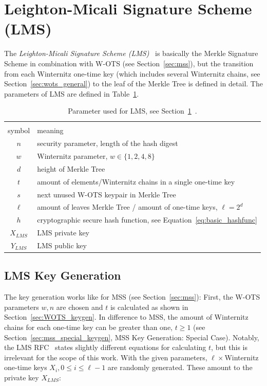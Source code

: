 \section{Leighton-Micali Signature Scheme (LMS)}
\label{sec:lms}
The \textit{Leighton-Micali Signature Scheme (LMS)}~\cite{LMS_RFC8554} is basically the Merkle Signature Scheme in combination with W-OTS (see Section~\ref{sec:mss}), but the transition from each Winternitz one-time key (which includes several Winternitz chains, see Section~\ref{sec:wots_general}) to the leaf of the Merkle Tree is defined in detail. 
The parameters of LMS are defined in Table~\ref{table:lms_param}.

\begin{table}
\centering
\begin{tabular}{c l} 
 \hline\noalign{\smallskip}
 \multicolumn{2}{c}{\textbf{LMS Parameter}} \\
 symbol & meaning \\ 
 \hline\noalign{\smallskip}
 $n$ & security parameter, length of the hash digest \\
 $w$ & Winternitz parameter, $w \in \{1,2,4,8\}$ \\ %
 $d$ & height of Merkle Tree \\
 $t$ & amount of elements/Winternitz chains in a single one-time key \\
 $s$ & next unused W-OTS keypair in Merkle Tree \\
 $\ell$ & amount of leaves Merkle Tree / amount of one-time keys, $\ell = 2^d$ \\
 $h$ & cryptographic secure hash function, see Equation~\ref{eq:basic_hashfunc} \\
 $X_{LMS}$ & LMS private key \\
 $Y_{LMS}$ & LMS public key \\
 \hline
\end{tabular}
\caption{Parameter used for LMS, see Section~\ref{sec:lms}~\cite{LMS_RFC8554}.}
\label{table:lms_param}
\end{table}

\subsection{LMS Key Generation}
The key generation works like for MSS (see Section~\ref{sec:mss}): First, the W-OTS parameters $w, n$ are chosen and $t$ is calculated as shown in Section~\ref{sec:WOTS_keygen}. In difference to MSS, the amount of Winternitz chains for each one-time key can be greater than one, $t \geq 1$ (see Section~\ref{sec:mss_special_keygen}, MSS Key Generation: Special Case).
Notably, the LMS RFC~\cite{LMS_RFC8554} states slightly different equations for calculating $t$, but this is irrelevant for the scope of this work. 
With the given parameters, $\ell \times$Winternitz one-time keys $X_i, 0 \leq i \leq \ell-1$ are randomly generated. These amount to the private key $X_{LMS}$:

